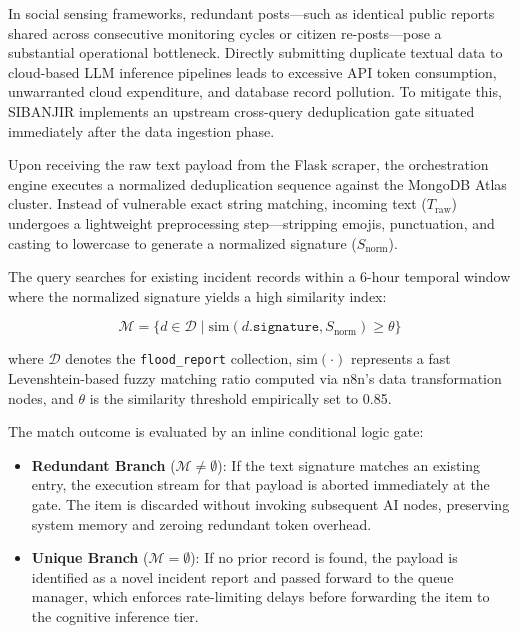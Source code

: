 \documentclass[conference]{IEEEtran}
\begin{document}
In social sensing frameworks, redundant posts—such as identical public reports shared across consecutive monitoring cycles or citizen re-posts—pose a substantial operational bottleneck. Directly submitting duplicate textual data to cloud-based LLM inference pipelines leads to excessive API token consumption, unwarranted cloud expenditure, and database record pollution. To mitigate this, SIBANJIR implements an upstream cross-query deduplication gate situated immediately after the data ingestion phase.

Upon receiving the raw text payload from the Flask scraper, the orchestration engine executes a normalized deduplication sequence against the MongoDB Atlas cluster. Instead of vulnerable exact string matching, incoming text ($T_{\text{raw}}$) undergoes a lightweight preprocessing step—stripping emojis, punctuation, and casting to lowercase to generate a normalized signature ($S_{\text{norm}}$). 

The query searches for existing incident records within a 6-hour temporal window where the normalized signature yields a high similarity index:

\begin{equation}
\mathcal{M} = \{d \in \mathcal{D} \mid \text{sim}(d.\texttt{signature}, S_{\text{norm}}) \geq \theta \}
\end{equation}

where $\mathcal{D}$ denotes the \texttt{flood\_report} collection, $\text{sim}(\cdot)$ represents a fast Levenshtein-based fuzzy matching ratio computed via n8n's data transformation nodes, and $\theta$ is the similarity threshold empirically set to 0.85. 

The match outcome is evaluated by an inline conditional logic gate:
\begin{itemize}
    \item \textbf{Redundant Branch} ($\mathcal{M} \neq \emptyset$): If the text signature matches an existing entry, the execution stream for that payload is aborted immediately at the gate. The item is discarded without invoking subsequent AI nodes, preserving system memory and zeroing redundant token overhead.
    \item \textbf{Unique Branch} ($\mathcal{M} = \emptyset$): If no prior record is found, the payload is identified as a novel incident report and passed forward to the queue manager, which enforces rate-limiting delays before forwarding the item to the cognitive inference tier.
\end{itemize}
\end{document}
